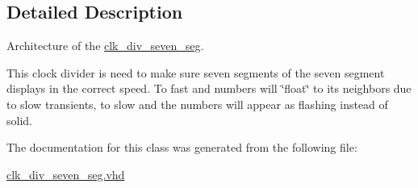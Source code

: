 \subsection{Detailed Description}
Architecture of the \hyperlink{classclk__div__seven__seg}{clk\-\_\-div\-\_\-seven\-\_\-seg}. 

This clock divider is need to make sure seven segments of the seven segment displays in the correct speed. To fast and numbers will \char`\"{}float\char`\"{} to its neighbors due to slow transients, to slow and the numbers will appear as flashing instead of solid. 

The documentation for this class was generated from the following file\-:\begin{DoxyCompactItemize}
\item 
\hyperlink{clk__div__seven__seg_8vhd}{clk\-\_\-div\-\_\-seven\-\_\-seg.\-vhd}\end{DoxyCompactItemize}
